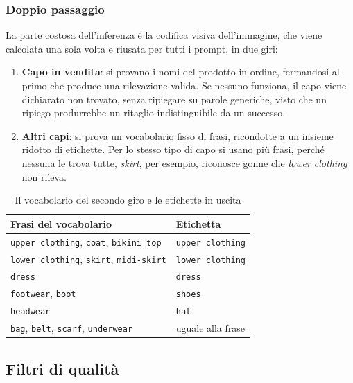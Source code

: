 \subsubsection{Doppio passaggio}

La parte costosa dell'inferenza è la codifica visiva dell'immagine, che viene calcolata una sola volta e riusata per tutti i prompt, in due giri:
\begin{enumerate}
  \item \textbf{Capo in vendita}: si provano i nomi del prodotto in ordine, fermandosi al primo che produce una rilevazione valida. Se nessuno funziona, il capo viene dichiarato non trovato, senza ripiegare su parole generiche, visto che un ripiego produrrebbe un ritaglio indistinguibile da un successo.
  
  \item \textbf{Altri capi}: si prova un vocabolario fisso di frasi, ricondotte a un insieme ridotto di etichette. Per lo stesso tipo di capo si usano più frasi, perché nessuna le trova tutte, \textit{skirt}, per esempio, riconosce gonne che \textit{lower clothing} non rileva.
\end{enumerate}

\begin{table}[htbp]
  \centering
  \small
  \begin{tabular}{p{7.2cm}l}
    \hline
    Frasi del vocabolario & Etichetta \\
    \hline
    \texttt{upper clothing}, \texttt{coat}, \texttt{bikini top}  & \texttt{upper clothing} \\
    \texttt{lower clothing}, \texttt{skirt}, \texttt{midi-skirt} & \texttt{lower clothing} \\
    \texttt{dress}                                               & \texttt{dress} \\
    \texttt{footwear}, \texttt{boot}                             & \texttt{shoes} \\
    \texttt{headwear}                                            & \texttt{hat} \\
    \texttt{bag}, \texttt{belt}, \texttt{scarf}, \texttt{underwear} & uguale alla frase \\
    \hline
  \end{tabular}
  \caption{Il vocabolario del secondo giro e le etichette in uscita}
  \label{tab:pip-vocabolario}
\end{table}

\newpage

\subsection{Filtri di qualità}

